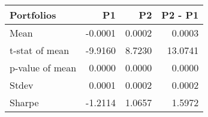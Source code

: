 \begin{tabular}{lrrr}
\toprule
Portfolios & P1 & P2 & P2 - P1 \\
\midrule
Mean & -0.0001 & 0.0002 & 0.0003 \\
t-stat of mean & -9.9160 & 8.7230 & 13.0741 \\
p-value of mean & 0.0000 & 0.0000 & 0.0000 \\
Stdev & 0.0001 & 0.0002 & 0.0002 \\
Sharpe & -1.2114 & 1.0657 & 1.5972 \\
\bottomrule
\end{tabular}
